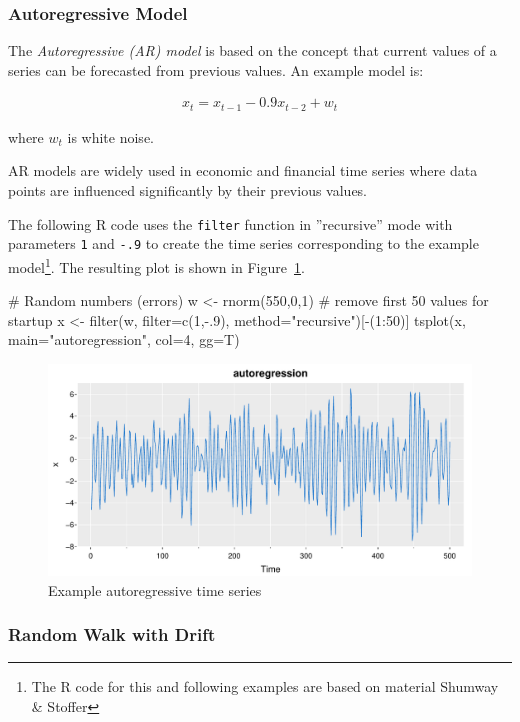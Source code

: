 \subsubsection*{Autoregressive Model}

The \emph{Autoregressive (AR) model} is based on the concept that current values of a series can be forecasted from previous values. An example model is:

\begin{align*}x_t = x_{t-1} - 0.9 x_{t-2} + w_t\end{align*}


\noindent where $w_t$ is white noise.

AR models are widely used in economic and financial time series where data points are influenced significantly by their previous values.

The following R code uses the \texttt{filter} function in ''recursive'' mode with parameters \texttt{1} and \texttt{-.9} to create the time series corresponding to the example model\footnote{The R code for this and following examples are based on material Shumway \& Stoffer}. The resulting plot is shown in Figure~\ref{fig:figure3}.

\begin{Rcode}
# Random numbers (errors)
w <- rnorm(550,0,1)
# remove first 50 values for startup
x <- filter(w, filter=c(1,-.9), method="recursive")[-(1:50)]
tsplot(x, main="autoregression", col=4, gg=T)
\end{Rcode}

\begin{figure}
\centering

\includegraphics[width=.75\textwidth]{figure3.pdf}
\caption{Example autoregressive time series}
\label{fig:figure3}
\end{figure}

\subsubsection*{Random Walk with Drift}

